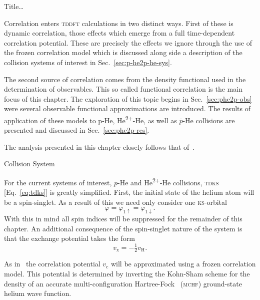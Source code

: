 \documentclass[letterpaper, 10 pt]{report}
\begin{document}
\begin{chapter}{ Title\dots \label{chap:p-he2p-he}} %

   Correlation enters \textsc{tddft} calculations in two distinct ways. First of these is dynamic
   correlation, those effects which emerge from a full time-dependent correlation potential. These are
   precisely the effects we ignore through the use of the frozen correlation model which is discussed
   along side a description of the collision systems of interest in Sec.~\ref{sec:p-he2p-he-sys}.

   The second source of correlation comes from the density functional
   used in the determination of observables. This so called functional correlation is the main focus of
   this chapter. The exploration of this topic begins in Sec.~\ref{sec:phe2p-obs} were several
   observable functional approximations are introduced. The results of application of these models to
   p-He, He\textsuperscript{2+}-He, as well as $\bar{p}$-He collisions are presented and discussed in
   Sec.~\ref{sec:phe2p-res}.

   The analysis presented in this chapter closely follows that of~\cite{p-he2p-he}.

   \begin{section}{Collision System \label{sec:p-he2p-he-sys}}

      For the current systems of interest, $p$-He and He\textsuperscript{2+}-He collisions,
      \textsc{tdks} [Eq.~\eqref{eq:tdks}] is greatly simplified. First, the initial state of the helium
      atom will be a spin-singlet. As a result of this we need only consider one \textsc{ks}-orbital
      \begin{equation} \label{eq:oneorb}
         \varphi = \varphi_{1\uparrow} = \varphi_{1\downarrow}.
      \end{equation}
      With this in mind all spin indices will be suppressed for the remainder of this chapter. An
      additional consequence of the spin-singlet nature of the system is that the exchange potential
      takes the form
      \begin{equation} \label{eq:vxvh}
         v_\mathrm{x} = - \tfrac{1}{2} v_\mathrm{H}.
      \end{equation}

      As in~\cite{pbarhe} the correlation potential $v_\mathrm{c}$ will be approximated using a frozen
      correlation model. This potential is determined by inverting the Kohn-Sham scheme for the density
      of an accurate multi-configuration Hartree-Fock~\cite{mchf} (\textsc{mchf}) ground-state helium
      wave function.


\end{section}
\end{chapter}
\end{document}
